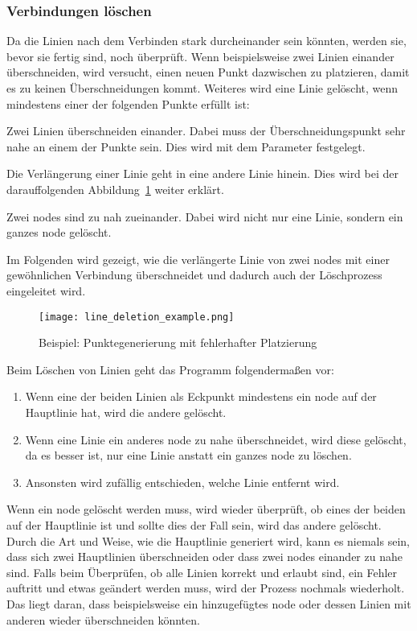 \subsubsection{Verbindungen löschen}\label{subsubsec:verbindungen-loeschen}
Da die Linien nach dem Verbinden stark durcheinander sein könnten, werden sie, bevor sie fertig sind, noch überprüft.
Wenn beispielsweise zwei Linien einander überschneiden, wird versucht, einen neuen Punkt dazwischen zu platzieren, damit es zu keinen Überschneidungen kommt.
Weiteres wird eine Linie gelöscht, wenn mindestens einer der folgenden Punkte erfüllt ist:
\begin{liste}
    \item Zwei Linien überschneiden einander.
    Dabei muss der Überschneidungspunkt sehr nahe an einem der Punkte sein.
    Dies wird mit dem Parameter  festgelegt.
    \item Die Verlängerung einer Linie geht in eine andere Linie hinein.
    Dies wird bei der darauffolgenden Abbildung~\ref{fig:line-deletion} weiter erklärt.
    \item Zwei nodes sind zu nah zueinander.
    Dabei wird nicht nur eine Linie, sondern ein ganzes node gelöscht.
\end{liste}

Im Folgenden wird gezeigt, wie die verlängerte Linie von zwei nodes mit einer gewöhnlichen Verbindung überschneidet und dadurch auch der Löschprozess eingeleitet wird.
\begin{figure}[H]
    \centering
    \texttt{[image: line\_deletion\_example.png]}
    \caption{Beispiel: Punktegenerierung mit fehlerhafter Platzierung}\label{fig:line-deletion}
\end{figure}

Beim Löschen von Linien geht das Programm folgendermaßen vor:
\begin{enumerate}
    \item Wenn eine der beiden Linien als Eckpunkt mindestens ein node auf der Hauptlinie hat, wird die andere gelöscht.
    \item Wenn eine Linie ein anderes node zu nahe überschneidet, wird diese gelöscht, da es besser ist, nur eine Linie anstatt ein ganzes node zu löschen.
    \item Ansonsten wird zufällig entschieden, welche Linie entfernt wird.
\end{enumerate}

Wenn ein node gelöscht werden muss, wird wieder überprüft, ob eines der beiden auf der Hauptlinie ist und sollte dies der Fall sein, wird das andere gelöscht.
Durch die Art und Weise, wie die Hauptlinie generiert wird, kann es niemals sein, dass sich zwei Hauptlinien überschneiden oder dass zwei nodes einander zu nahe sind.
Falls beim Überprüfen, ob alle Linien korrekt und erlaubt sind, ein Fehler auftritt und etwas geändert werden muss, wird der Prozess nochmals wiederholt.
Das liegt daran, dass beispielsweise ein hinzugefügtes node oder dessen Linien mit anderen wieder überschneiden könnten.

